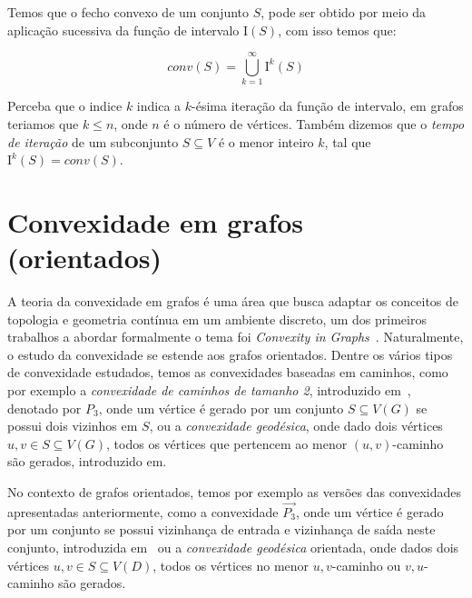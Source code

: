 Temos que o fecho convexo de um conjunto $S$, pode ser obtido por meio da aplicação sucessiva da função de intervalo I$(S)$, com isso temos que:

\[
conv(S) = \bigcup_{k=1}^{\infty}\text{I}^k(S)
\]

Perceba que o indice $k$ indica a $k$-ésima iteração da função de intervalo, em grafos teriamos que $k \leq n$, onde $n$ é o número de vértices. Também dizemos que o \emph{tempo de iteração} de um subconjunto $S\subseteq V$ é o menor inteiro $k$, tal que $\text{I}^k(S) = conv(S)$.

\section{Convexidade em grafos (orientados)}


A teoria da convexidade em grafos é uma área que busca adaptar os conceitos de topologia e geometria contínua em um ambiente discreto, um dos primeiros trabalhos a abordar formalmente o tema foi \textit{Convexity in Graphs}~\cite{harary1981}. Naturalmente, o estudo da convexidade se estende aos grafos orientados. Dentre os vários tipos de convexidade estudados, temos as convexidades baseadas em caminhos, como por exemplo a \emph{convexidade de caminhos de tamanho 2}, introduzido em~\cite{CENTENO200911}, denotado por $P_3$, onde um vértice é gerado por um conjunto $S \subseteq V(G)$ se possui dois vizinhos em $S$, ou a \emph{convexidade geodésica}, onde dado dois vértices $u,v \in S \subseteq V(G)$, todos os vértices que pertencem ao menor $(u,v)$-caminho são gerados, introduzido em\cite{HARARY199389}.

No contexto de grafos orientados, temos por exemplo as versões das convexidades apresentadas anteriormente, como a convexidade $\overrightarrow{P_3}$, onde um vértice é gerado por um conjunto se possui vizinhança de entrada e vizinhança de saída neste conjunto, introduzida em~\cite{ERDOS1972} ou a \emph{convexidade geodésica} orientada, onde dados dois vértices $u,v \in S \subseteq V(D)$, todos os vértices no menor $u,v$-caminho ou $v,u$-caminho são gerados.

